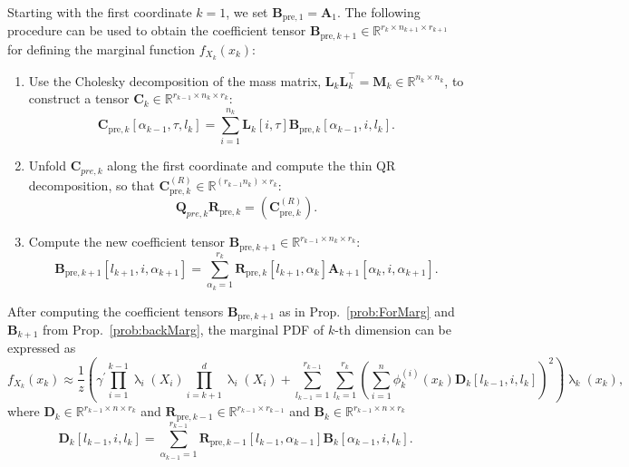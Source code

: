 \begin{prop}
	\label{prob:ForMarg}
	Starting with the first coordinate $k = 1$, we set $\bm{B}_{\text{pre},1} = \bm{A}_1$. The following procedure can be used to obtain the coefficient tensor $\bm{B}_{\text{pre},k+1} \in \mathbb{R}^{r_{k} \times n_{k+1} \times r_{k+1}}$ for defining the marginal function $f_{X_k}(x_k)$:
	\begin{enumerate}
		\item Use the Cholesky decomposition of the mass matrix, $\bm{L}_k \bm{L}_k^\top = \bm{M}_k \in \mathbb{R}^{n_k \times n_k}$, to construct a tensor $\bm{C}_k \in \mathbb{R}^{r_{k-1} \times n_k \times r_k}$:
		\begin{equation}
			\bm{C}_{\text{pre},k}[\alpha_{k-1}, \tau, l_k] = \sum_{i=1}^{n_k} \bm{L}_k[i, \tau] \bm{B}_{\text{pre},k}[\alpha_{k-1}, i, l_k] .
		\end{equation}
		\item Unfold $\bm{C}_{pre,k}$ along the first coordinate and compute the thin QR decomposition, so that $\bm{C}_{\text{pre},k}^{(R)} \in \mathbb{R}^{(r_{k-1} n_k ) \times r_k}$:
		\begin{equation}
			\bm{Q}_{pre,k}\bm{R}_{\text{pre},k} = {(\bm{C}_{\text{pre},k}^{(R)})}.
		\end{equation}
		\item Compute the new coefficient tensor $\bm{B}_{\text{pre}, k+1} \in \mathbb{R}^{r_{k-1} \times n_k \times r_k} $:
		\begin{equation}
			\bm{B}_{\text{pre}, k+1}[l_{k+1}, i, \alpha_{k+1}] = \sum_{\alpha_{k}=1}^{r_{k}} \bm{R}_{\text{pre},k}[l_{k+1}, \alpha_{k}] \bm{A}_{k+1}[\alpha_{k}, i, \alpha_{k+1}] .
		\end{equation}
	\end{enumerate}
\end{prop}
After computing the coefficient tensors $\bm{B}_{\text{pre}, k+1}$ as in Prop.~\ref{prob:ForMarg} and $\bm{B}_{k+1}$ from Prop.~\ref{prob:backMarg}, the marginal PDF of $k$-th dimension can be expressed as
\begin{equation}
	f_{X_k}(x_k)  \approx \frac{1}{z} \left(\gamma^{\prime} \prod_{i=1}^{k-1} \uplambda_i(X_i) \prod_{i=k+1}^{d} \uplambda_i(X_i) + \sum_{l_{k-1}=1}^{r_{k-1}} \sum_{l_k=1}^{r_k} \left(\sum_{i=1}^{n} \phi^{(i)}_k(x_k) \bm{D}_k[l_{k-1},i, l_k] \right)^2 \right) \uplambda_k(x_k),
\end{equation}
where $\bm{D}_k \in \mathbb{R}^{r_{k-1} \times n \times r_k}$ and $\bm{R}_{\text{pre},k-1}\in \mathbb{R}^{r_{k-1} \times r_{k-1}}$ and $\bm{B}_k \in \mathbb{R}^{r_{k-1} \times n \times r_k}$
\begin{equation}
	\bm{D}_k[l_{k-1},i,l_k] = \sum_{\alpha_{k-1}=1}^{r_{k-1}}  \bm{R}_{\text{pre},k-1}[l_{k-1}, \alpha_{k-1}] \bm{B}_k[\alpha_{k-1}, i, l_k].
\end{equation}

